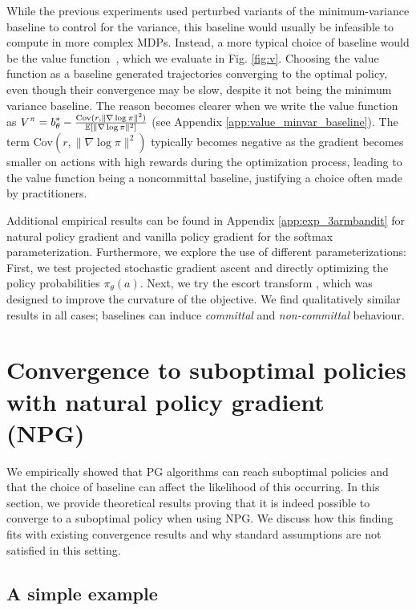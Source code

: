 While the previous experiments used perturbed variants of the minimum-variance baseline to control for the variance, this baseline would usually be infeasible to compute in more complex MDPs. Instead, a more typical choice of baseline would be the value function~\citep[Ch.~13]{sutton18book}, which we evaluate in Fig. \ref{fig:v}.
Choosing the value function as a baseline generated trajectories converging to the optimal policy, even though their convergence may be slow, despite it not being the minimum variance baseline.
The reason becomes clearer when we write the value function as $\displaystyle V^\pi = b^\ast_\theta - \tfrac{\textrm{Cov}(r, \|\nabla \log \pi\|^2)}{\mathbb{E}[\|\nabla \log \pi\|^2]}$ (see Appendix \ref{app:value_minvar_baseline}). The term $\textrm{Cov}(r, \|\nabla \log \pi\|^2)$ typically becomes negative as the gradient becomes smaller on actions with high rewards during the optimization process, leading to the value function being a noncommittal baseline, justifying a choice often made by practitioners. 

Additional empirical results can be found in Appendix \ref{app:exp_3armbandit} for natural policy gradient and vanilla policy gradient for the softmax parameterization. Furthermore, we explore the use of different parameterizations: First, we test projected stochastic gradient ascent and directly optimizing the policy probabilities $\pi_\theta(a)$. Next, we try the escort transform \citep{mei2020escaping}, which was designed to improve the curvature of the objective. We find qualitatively similar results in all cases; baselines can induce \textit{committal} and \textit{non-committal} behaviour. 

\section{Convergence to suboptimal policies with natural policy gradient (NPG)}

We empirically showed that PG algorithms can reach suboptimal policies and that the choice of baseline can affect the likelihood of this occurring. 
In this section, we provide theoretical results proving that it is indeed possible to converge to a suboptimal policy when using NPG. 
We discuss how this finding fits with existing convergence results and why standard assumptions are not satisfied in this setting. 

\subsection{A simple example}\label{sec:divergence_example}

